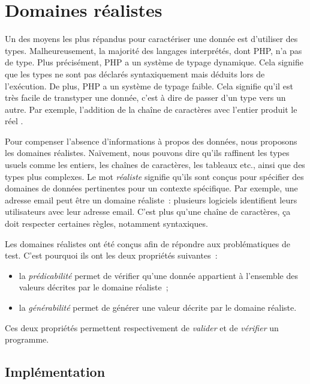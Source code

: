 \section{Domaines réalistes}
\label{section:language:realdoms}

Un des moyens les plus répandus pour caractériser une donnée est d'utiliser des
types. Malheureusement, la majorité des langages interprétés, dont PHP, n'a pas
de type. Plus précisément, PHP a un système de typage dynamique. Cela signifie
que les types ne sont pas déclarés syntaxiquement mais déduits lors de
l'exécution. De plus, PHP a un système de typage faible. Cela signifie qu'il est
très facile de transtyper une donnée, c'est à dire de passer d'un type vers un
autre. Par exemple, l'addition de la chaîne de caractères  avec
l'entier  produit le réel .

Pour compenser l'absence d'informations à propos des données, nous proposons les
domaines réalistes. Naïvement, nous pouvons dire qu'ils raffinent les types
usuels comme les entiers, les chaînes de caractères, les tableaux etc., ainsi
que des types plus complexes. Le mot {\em réaliste} signifie qu'ils sont conçus
pour spécifier des domaines de données pertinentes pour un contexte spécifique.
Par exemple, une adresse email peut être un domaine réaliste~: plusieurs
logiciels identifient leurs utilisateurs avec leur adresse email. C'est plus
qu'une chaîne de caractères, ça doit respecter certaines règles, notamment
syntaxiques.

Les domaines réalistes ont été conçus afin de répondre aux problématiques de
test. C'est pourquoi ils ont les deux propriétés suivantes~:

\begin{itemize}

\item la {\em prédicabilité} permet de vérifier qu'une donnée appartient à
l'ensemble des valeurs décrites par le domaine réaliste~;

\item la {\em générabilité} permet de générer une valeur décrite par le domaine
réaliste.

\end{itemize}

Ces deux propriétés permettent respectivement de {\em valider} et de {\em
vérifier} un programme.

\subsection{Implémentation}
\label{subsection:language:realdom:implementation}

